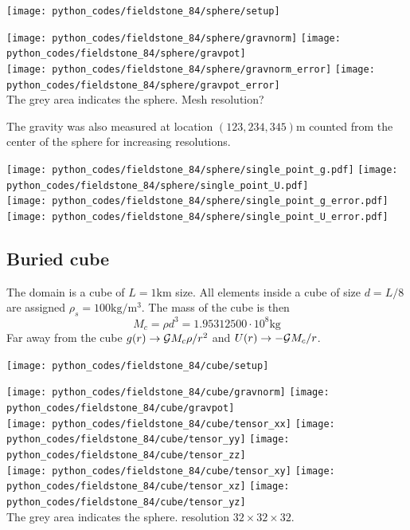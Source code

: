 \begin{center}
\texttt{[image: python\_codes/fieldstone\_84/sphere/setup]}
\end{center}


\begin{center}
\texttt{[image: python\_codes/fieldstone\_84/sphere/gravnorm]}
\texttt{[image: python\_codes/fieldstone\_84/sphere/gravpot]}\\
\texttt{[image: python\_codes/fieldstone\_84/sphere/gravnorm\_error]}
\texttt{[image: python\_codes/fieldstone\_84/sphere/gravpot\_error]}\\
{\captionfont  The grey area indicates the sphere. Mesh resolution?}
\end{center}

The gravity was also measured at location $(123,234,345)\si{\metre}$ counted from the center of the sphere
for increasing resolutions. 

\begin{center}
\texttt{[image: python\_codes/fieldstone\_84/sphere/single\_point\_g.pdf]}
\texttt{[image: python\_codes/fieldstone\_84/sphere/single\_point\_U.pdf]}\\
\texttt{[image: python\_codes/fieldstone\_84/sphere/single\_point\_g\_error.pdf]}
\texttt{[image: python\_codes/fieldstone\_84/sphere/single\_point\_U\_error.pdf]}
\end{center}


\newpage
\subsection*{Buried cube}

The domain is a cube of $L=1\si{\km}$ size. All elements inside a cube of size $d=L/8$ are assigned
$\rho_s=100\si{\kg\per\cubic\metre}$.
The mass of the cube is then
\[
M_c = \rho d^3 = 1.95312500\cdot 10^8 \si{\kg}
\]
Far away from the cube $g(r) \rightarrow {\cal G}M_c \rho/r^2$ and $U(r) \rightarrow -{\cal G} M_c/r$.

\begin{center}
\texttt{[image: python\_codes/fieldstone\_84/cube/setup]}
\end{center}


\begin{center}
\texttt{[image: python\_codes/fieldstone\_84/cube/gravnorm]}
\texttt{[image: python\_codes/fieldstone\_84/cube/gravpot]}\\
\texttt{[image: python\_codes/fieldstone\_84/cube/tensor\_xx]}
\texttt{[image: python\_codes/fieldstone\_84/cube/tensor\_yy]}
\texttt{[image: python\_codes/fieldstone\_84/cube/tensor\_zz]}\\
\texttt{[image: python\_codes/fieldstone\_84/cube/tensor\_xy]}
\texttt{[image: python\_codes/fieldstone\_84/cube/tensor\_xz]}
\texttt{[image: python\_codes/fieldstone\_84/cube/tensor\_yz]}\\
{\captionfont  The grey area indicates the sphere. resolution $32\times 32 \times 32$.}
\end{center}

